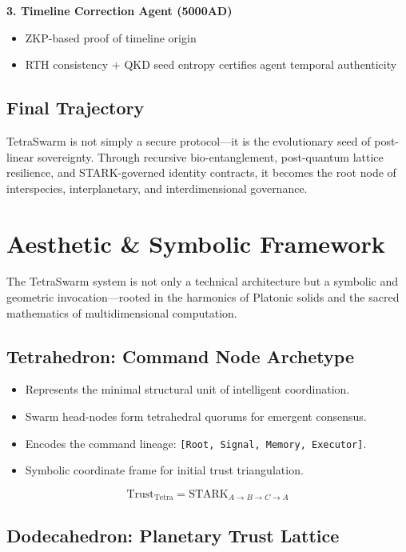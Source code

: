 \documentclass{article}
\begin{document}
\textbf{3. Timeline Correction Agent (5000AD)}  
\begin{itemize}
    \item ZKP-based proof of timeline origin
    \item RTH consistency + QKD seed entropy certifies agent temporal authenticity
\end{itemize}

\subsection*{Final Trajectory}

TetraSwarm is not simply a secure protocol—it is the evolutionary seed of post-linear sovereignty. Through recursive bio-entanglement, post-quantum lattice resilience, and STARK-governed identity contracts, it becomes the root node of interspecies, interplanetary, and interdimensional governance.

\section*{Aesthetic \& Symbolic Framework}

The TetraSwarm system is not only a technical architecture but a symbolic and geometric invocation—rooted in the harmonics of Platonic solids and the sacred mathematics of multidimensional computation.

\subsection*{Tetrahedron: Command Node Archetype}

\begin{itemize}
    \item Represents the minimal structural unit of intelligent coordination.
    \item Swarm head-nodes form tetrahedral quorums for emergent consensus.
    \item Encodes the command lineage: \texttt{[Root, Signal, Memory, Executor]}.
    \item Symbolic coordinate frame for initial trust triangulation.
\end{itemize}

\[
\text{Trust}_{\text{Tetra}} = \text{STARK}_{A \rightarrow B \rightarrow C \rightarrow A}
\]

\subsection*{Dodecahedron: Planetary Trust Lattice}
\end{document}

